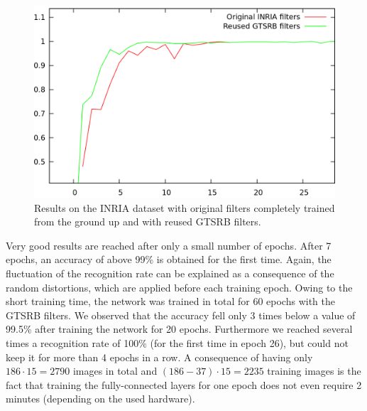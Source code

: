\documentclass[11pt, a4paper]{article}
\begin{document}
\begin{figure}[h!]
	\centering
	\includegraphics[width=1\textwidth]{inria_results.png}
	\caption{Results on the INRIA dataset with original filters completely trained from the ground up and with reused GTSRB filters.}
	\label{fig:inria_results}
\end{figure}

Very good results are reached after only a small number of epochs. After 7 epochs, an accuracy of above 99\% is obtained for the first time. Again, the fluctuation of the recognition rate can be explained as a consequence of the random distortions, which are applied before each training epoch. Owing to the short training time, the network was trained in total for 60 epochs with the GTSRB filters. We observed that the accuracy fell only 3 times below a value of 99.5\% after training the network for 20 epochs. Furthermore we reached several times a recognition rate of 100\% (for the first time in epoch 26), but could not keep it for more than 4 epochs in a row.
A consequence of having only $186 \cdot 15 = 2790$ images in total and $(186 - 37) \cdot 15 = 2235$ training images is the fact that training the fully-connected layers for one epoch does not even require 2 minutes (depending on the used hardware).
\end{document}
